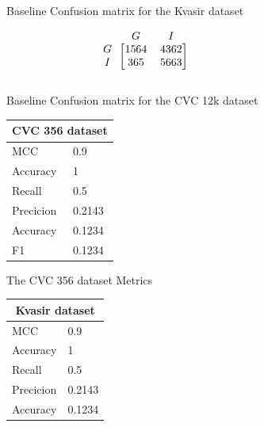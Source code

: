 \begin{figure}[h]
\begin{subfigure}[b]{0.49\textwidth}
        
\caption{Baseline Confusion matrix for the Kvasir dataset}
\label{mat:kvasir_CM_base}
\end{subfigure}
\begin{subfigure}[b]{0.25\textwidth}
        \[
\begin{blockarray}{ccc}
& G & I  \\
\begin{block}{c[cc]}
 		G&1564 & 4362\\
        I&365  & 5663\\
\end{block}
\end{blockarray}
\]   
\caption{Baseline Confusion matrix for the CVC 12k dataset}
\label{mat:cvc12k_CM_base}
\end{subfigure}
\caption{Confusion matrices for the three datasets}
\label{mat:CM_base}
\begin{subfigure}[b]{0.25\textwidth}
\begin{tabular}{ll}      
        \toprule
        \multicolumn{2}{c}{CVC 356 dataset}        \\
        \midrule
        MCC & 0.9    \\
        Accuracy                         & 1      \\
        Recall                              & 0.5    \\
        Precicion                        & 0.2143 \\
        Accuracy                        & 0.1234 \\
        F1                                     & 0.1234\\
        \bottomrule
        \end{tabular}
\caption{The CVC 356 dataset Metrics}
\label{tab:cvc356_metrics_base}
\end{subfigure}%
\begin{subfigure}[b]{0.49\textwidth}
    	\centering
        \begin{tabular}{ll}
        \toprule
        \multicolumn{2}{c}{Kvasir dataset}        \\
        \midrule
        MCC & 0.9    \\
        Accuracy                         & 1      \\
        Recall                              & 0.5    \\
        Precicion                        & 0.2143 \\
        Accuracy                        & 0.1234 \\

\end{tabular}
\end{subfigure}
\end{figure}
